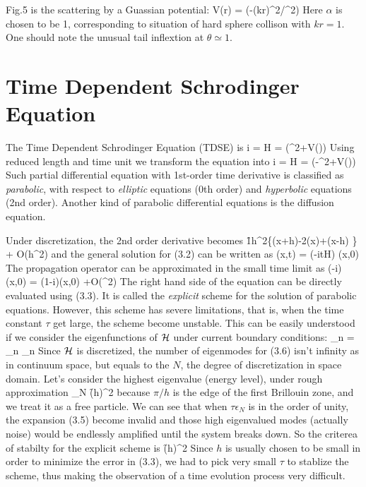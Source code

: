 \begin{center}
\end{center}

Fig.5 is the scattering by a Guassian potential:
\ee V(r) = \exp(-(kr)^{2}/\alpha^2) \ed
Here $\alpha$ is chosen to be 1, corresponding to situation of hard
sphere collison with $kr = 1$. One should note the unusual tail
inflextion at $\theta \simeq 1$.

\chapter{Time Dependent Schrodinger Equation}

The Time Dependent Schrodinger Equation (TDSE) is
\ee i\hbar{} 
= {\cal H} \psi = (\nabla^{2}+V())\psi
\ed
Using reduced length and time unit we transform the equation into
\ee i 
= {\cal H} \psi = (-\nabla^{2}+V())\psi
\ed
Such partial differential equation with 1st-order time derivative is
classified as {\em parabolic}, with respect to {\em elliptic}
equations (0th order) and {\em hyperbolic} equations (2nd order).
Another kind of parabolic differential equations is the diffusion
equation.

Under discretization, the 2nd order derivative becomes
\ee
{} \longrightarrow \f{1}{h^2}\{\phi(x+h)-2\phi(x)+\phi(x-h) \}
+ {\cal O}(h^2) \ed
and the general solution for (3.2) can be written as
\ee
\psi(x,t) = \exp(-it{\cal H}) \psi(x,0)
\ed
The propagation operator can be approximated in the small time limit
as
\ee \exp(-i)\psi(x,0) = (1-i)\psi(x,0)
+{\cal O}(\tau^{2}) \ed The right hand side of the equation can be
directly evaluated using (3.3). It is called the {\em explicit} scheme
for the solution of parabolic equations.  However, this scheme has
severe limitations, that is, when the time constant $\tau$ get large,
the scheme become unstable.  This can be easily understood if we
consider the eigenfunctions of ${{\cal H}}$ under current boundary
conditions:
 \psi_{n} = \epsilon_{n} \psi_{n} \ed
Since ${\cal H}$ is discretized, the number of eigenmodes for (3.6)
isn't infinity as in continuum space, but equals to the $N$, the
degree of discretization in space domain. Let's consider the highest
eigenvalue (energy level), under rough approximation
\ee \epsilon_{N} \approx (\f{\pi}{h})^2 \ed
because $\pi/h$ is the edge of the first Brillouin zone, and we treat
it as a free particle. We can see that when $\tau\epsilon_{N}$ is in
the order of unity, the expansion (3.5) become invalid and those high
eigenvalued modes (actually noise) would be endlessly amplified until
the system breaks down. So the criterea of stabilty for the explicit
scheme is
\ee \tau(\f{\pi}{h})^2 \ed
Since $h$ is usually chosen to be small in order to minimize the error
in (3.3), we had to pick very small $\tau$ to stablize the scheme,
thus making the observation of a time evolution process very
difficult.
 

